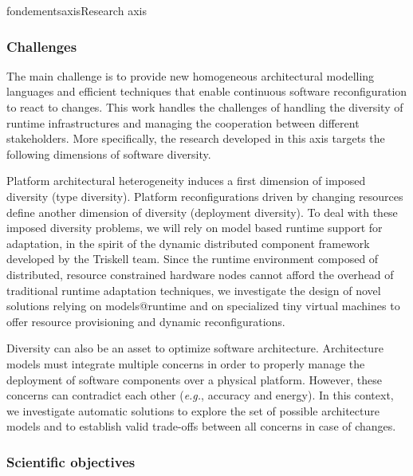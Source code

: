 \documentclass{ra2018}
\begin{document}
\begin{module}{fondements}{axis}{Research axis}
\subsubsection*{Challenges} 

The main challenge is to provide new homogeneous architectural modelling languages and efficient techniques that enable continuous software reconfiguration to react to changes. This work handles the challenges of handling the diversity of runtime infrastructures and managing the cooperation between different stakeholders. More specifically, the research developed in this axis targets the following dimensions of software diversity.


Platform architectural heterogeneity induces a first dimension of imposed diversity (type diversity). Platform reconfigurations driven by changing resources define another dimension of diversity (deployment diversity). To deal with these imposed diversity problems, we will  rely on  model based runtime support for adaptation, in the spirit of the dynamic distributed component framework developed by the Triskell team. Since the runtime environment composed of distributed, resource constrained hardware nodes cannot afford the overhead of traditional runtime adaptation techniques, we investigate the design of novel solutions relying on models@runtime and on specialized tiny virtual machines to offer resource provisioning and dynamic reconfigurations. 


Diversity can also be an asset to optimize software architecture. Architecture models must integrate multiple concerns in order to properly manage the deployment of software components over a physical platform. However, these concerns can contradict each other (\textit{e.g.}, accuracy and energy). In this context, we investigate automatic solutions to explore the set of possible architecture models and to establish valid trade-offs between all concerns in case of changes. 



\subsubsection*{Scientific objectives} 


\end{module}
\end{document}
